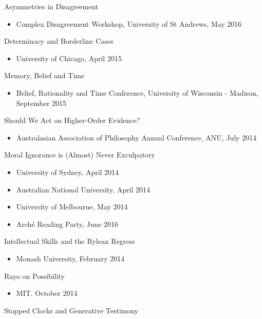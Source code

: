 \documentclass[
  10pt,
  letterpaper,
  DIV=11,
  numbers=noendperiod,
  twoside]{scrartcl}
\providecommand{\tightlist}{%
  \setlength{\itemsep}{0pt}\setlength{\parskip}{0pt}}\usepackage{longtable,booktabs,array}
\begin{document}
Asymmetries in Disagreement

\begin{itemize}
\tightlist
\item
  Complex Disagreement Workshop, University of St Andrews, May 2016
\end{itemize}

Determinacy and Borderline Cases

\begin{itemize}
\tightlist
\item
  University of Chicago, April 2015
\end{itemize}

Memory, Belief and Time

\begin{itemize}
\tightlist
\item
  Belief, Rationality and Time Conference, University of Wisconsin -
  Madison, September 2015
\end{itemize}

Should We Act on Higher-Order Evidence?

\begin{itemize}
\tightlist
\item
  Australasian Association of Philosophy Annual Conference, ANU, July
  2014
\end{itemize}

Moral Ignorance is (Almost) Never Exculpatory

\begin{itemize}
\tightlist
\item
  University of Sydney, April 2014
\item
  Australian National University, April 2014
\item
  University of Melbourne, May 2014
\item
  Arché Reading Party, June 2016
\end{itemize}

Intellectual Skills and the Rylean Regress

\begin{itemize}
\tightlist
\item
  Monash University, February 2014
\end{itemize}

Rayo on Possibility

\begin{itemize}
\tightlist
\item
  MIT, October 2014
\end{itemize}

Stopped Clocks and Generative Testimony
\end{document}
